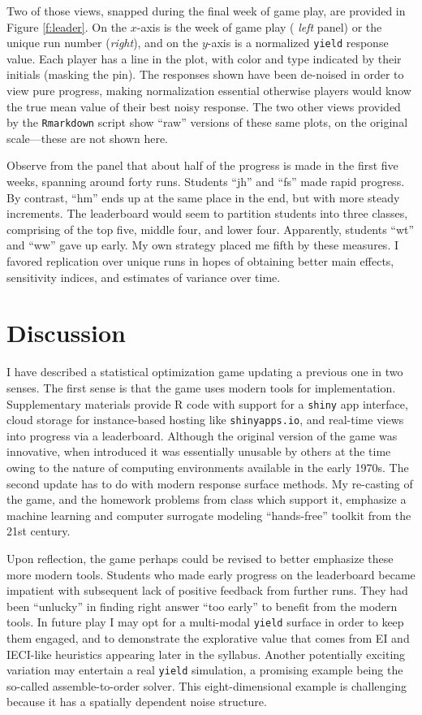 \documentclass[12pt]{article}
\begin{document}
Two of those views, snapped during the final week of game play, are provided
in Figure \ref{f:leader}.  On the $x$-axis is the week of game play ({\em
left} panel) or the unique run number ({\em right}), and on the $y$-axis is a
normalized {\tt yield} response value.  Each player has a line in the plot,
with color and type indicated by their initials (masking the pin).  The
responses shown have been de-noised in order to view pure progress, making
normalization essential otherwise players would know the true mean value of
their best noisy response. The two other views provided by the {\tt Rmarkdown}
script show ``raw'' versions of these same plots, on the original
scale---these are not shown here.

Observe from the panel that about half of the progress is made in the first
five weeks, spanning around forty runs.  Students ``jh'' and ``fs'' made rapid
progress.  By contrast, ``hm'' ends up at the same place in the end, but with
more steady increments. The leaderboard would seem to partition students into
three classes, comprising of the top five, middle four, and lower four.
Apparently, students ``wt'' and ``ww'' gave up early.  My own strategy placed
me fifth by these measures.  I favored replication over unique runs in hopes of
obtaining better main effects, sensitivity indices, and estimates of variance
over time.

\section{Discussion}
\label{sec:discuss}

I have described a statistical optimization game updating a previous one in
two senses.  The first sense is that the game uses modern tools for
implementation.  Supplementary materials provide {\sf R} code with support for
a {\tt shiny} app interface, cloud storage for instance-based hosting like
{\tt shinyapps.io}, and real-time views into progress via a leaderboard.
Although the original version of the game was innovative, when introduced it
was essentially unusable by others at the time owing to the nature of
computing environments available in the early 1970s.  The second update has to
do with modern response surface methods.  My re-casting of the game, and the
homework problems from class which support it, emphasize a machine learning
and computer surrogate modeling ``hands-free'' toolkit from the 21st century.

Upon reflection, the game perhaps could be revised to better emphasize these
more modern tools.  Students who made early progress on the leaderboard became
impatient with subsequent lack of positive feedback from further runs.  They
had been ``unlucky'' in finding right answer ``too early'' to benefit from the
modern tools.  In future play I may opt for a multi-modal {\tt yield} surface
in order to keep them engaged, and to demonstrate the explorative value that
comes from EI and IECI-like heuristics appearing later in the syllabus.
Another potentially exciting variation may entertain a real {\tt yield}
simulation, a promising example being the so-called assemble-to-order
\citep[ATO,][]{xie:frazier:chick:2012} solver. This eight-dimensional example is
challenging because it has a spatially dependent noise structure.
\end{document}
